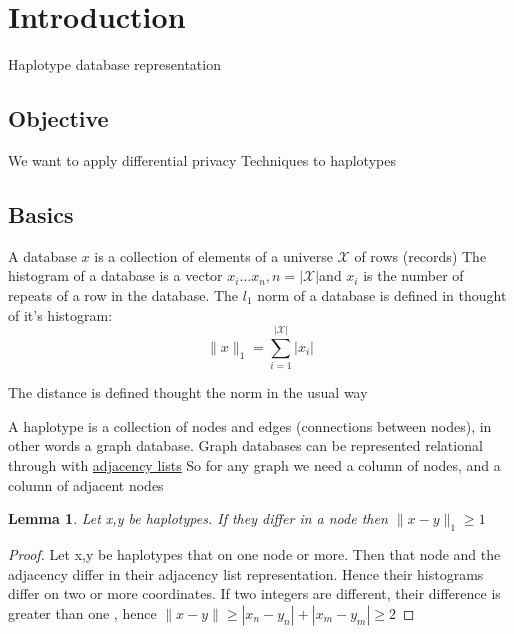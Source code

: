 \documentclass[12pt]{article}
\newtheorem{lemma}{Lemma}
\begin{document}
\maketitle



\section*{Introduction}
Haplotype database representation

\subsection*{Objective}
We want to apply differential privacy Techniques to haplotypes

\subsection*{Basics}
A database $x$ is a collection  of elements of a universe $\mathcal{X}$ of rows (records)
The histogram of a database is a vector $x_i \ldots x_n, n = |\mathcal{X}| $and $x_i$ is the number
of repeats of a row in the database. The $l_1$ norm of a database is defined in thought of
it's histogram:
\begin{equation}
        \|x\|_1 = \sum_{i=1}^{|\mathcal{X}|} |x_i|
\end{equation}



The distance is defined thought the norm in the usual way

A haplotype is a  collection of nodes and edges (connections between nodes), in
other words a graph database.
Graph databases can be represented relational through with \href{ https://en.wikipedia.org/wiki/Adjacency_list}{adjacency lists}
So for any graph we need a column of nodes, and a column of adjacent nodes

\begin{lemma}
Let x,y be haplotypes. If they differ in a node then  $\|x-y\|_1 \geq 1$ %
\end{lemma}


\begin{proof}
Let x,y  be haplotypes that on one node or more. Then that node and the adjacency differ in their adjacency list representation. Hence their
histograms differ on two or more coordinates. If two integers are different, their difference is greater than one , hence $\|x-y\| \geq |x_n-y_n| + |x_m-y_m| \geq 2$
\end{proof}



% 

\end{document}
